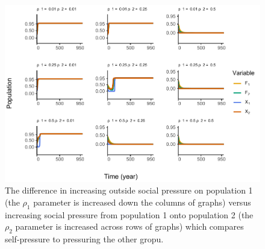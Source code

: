 \documentclass[
]{article}
\begin{document}
\begin{figure}
\centering
\includegraphics{BothRhos_files/figure-latex/influenceAsym-1.pdf}
\caption{\label{fig:influenceAsym}The difference in increasing outside social pressure on population 1 (the \(\rho_1\) parameter is increased down the columns of graphs) versus increasing social pressure from population 1 onto population 2 (the \(\rho_2\) parameter is increased across rows of graphs) which compares self-pressure to pressuring the other gropu. \label{influenceAsym}}
\end{figure}
\end{document}
